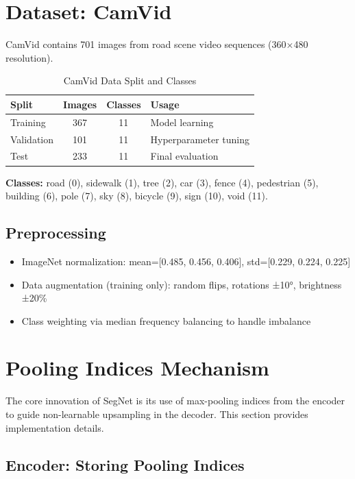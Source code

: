 \documentclass[11pt,a4paper]{report}
\begin{document}
\section{Dataset: CamVid}

CamVid contains 701 images from road scene video sequences (360×480 resolution).

\begin{table}[H]
\centering
\caption{CamVid Data Split and Classes}
\label{tab:dataset}
\begin{tabular}{lccl}
\toprule
\rowcolor{tableheader}
\textbf{Split} & \textbf{Images} & \textbf{Classes} & \textbf{Usage} \\
\midrule
Training & 367 & 11 & Model learning \\
Validation & 101 & 11 & Hyperparameter tuning \\
Test & 233 & 11 & Final evaluation \\
\bottomrule
\end{tabular}
\end{table}

\textbf{Classes:} road (0), sidewalk (1), tree (2), car (3), fence (4), pedestrian (5), building (6), pole (7), sky (8), bicycle (9), sign (10), void (11).

\subsection*{Preprocessing}
\begin{itemize}
  \item ImageNet normalization: mean=[0.485, 0.456, 0.406], std=[0.229, 0.224, 0.225]
  \item Data augmentation (training only): random flips, rotations ±10°, brightness ±20\%
  \item Class weighting via median frequency balancing to handle imbalance
\end{itemize}

\section{Pooling Indices Mechanism}

The core innovation of SegNet is its use of max-pooling indices from the encoder to guide non-learnable upsampling in the decoder. This section provides implementation details.

\subsection*{Encoder: Storing Pooling Indices}
\end{document}
